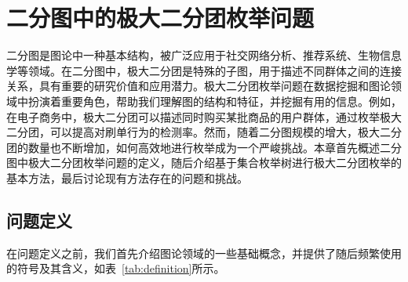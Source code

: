 \chapter{二分图中的极大二分团枚举问题}
\label{ch:intro}

二分图是图论中一种基本结构，被广泛应用于社交网络分析、推荐系统、生物信息学等领域。在二分图中，极大二分团是特殊的子图，用于描述不同群体之间的连接关系，具有重要的研究价值和应用潜力。极大二分团枚举问题在数据挖掘和图论领域中扮演着重要角色，帮助我们理解图的结构和特征，并挖掘有用的信息。例如，在电子商务中，极大二分团可以描述同时购买某批商品的用户群体，通过枚举极大二分团，可以提高对刷单行为的检测率。然而，随着二分图规模的增大，极大二分团的数量也不断增加，如何高效地进行枚举成为一个严峻挑战。本章首先概述二分图中极大二分团枚举问题的定义，随后介绍基于集合枚举树进行极大二分团枚举的基本方法，最后讨论现有方法存在的问题和挑战。


\section{问题定义}

在问题定义之前，我们首先介绍图论领域的一些基础概念，并提供了随后频繁使用的符号及其含义，如表~\ref{tab:definition}所示。

